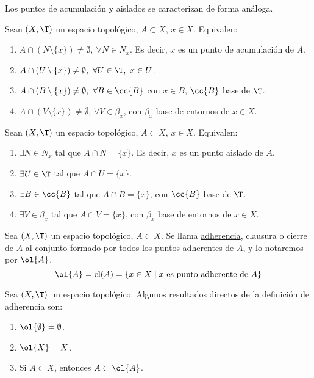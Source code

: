 Los puntos de acumulación y aislados se caracterizan de forma análoga.
\begin{prop}\label{prop:Caract_PtoAcumulación}
    Sean $(X,\T)$ un espacio topológico, $A\subset X$, $x\in X$. Equivalen:
    \begin{enumerate}
        \item $A\cap (N\setminus \{x\})\neq \emptyset,~\forall N\in N_x$. Es decir, $x$ es un punto de acumulación de $A$.
        \item $A\cap (U\setminus \{x\})\neq \emptyset,~\forall U\in \T,~x\in U$.
        \item $A\cap (B\setminus \{x\})\neq \emptyset,~\forall B\in \cc{B}$ con $x\in B$, $\cc{B}$ base de $\T$.
        \item $A\cap (V\setminus \{x\})\neq \emptyset$, $\forall V\in \beta_x$, con $\beta_x$ base de entornos de $x\in X$.
    \end{enumerate}
\end{prop}
\begin{prop}\label{prop:Caract_PtoAislado}
    Sean $(X,\T)$ un espacio topológico, $A\subset X$, $x\in X$. Equivalen:
    \begin{enumerate}
        \item $\exists N\in N_x$ tal que $A\cap N=\{x\}$. Es decir, $x$ es un punto aislado de $A$.
        \item $\exists U\in \T$ tal que $A\cap U = \{x\}$.
        \item $\exists B\in \cc{B}$ tal que $A\cap B = \{x\}$, con $\cc{B}$ base de $\T$.
        \item $\exists V\in \beta_x$ tal que $A\cap V = \{x\}$, con $\beta_x$ base de entornos de $x\in X$.
    \end{enumerate}
\end{prop}


\begin{definicion}[Adherencia] Sea $(X,\T)$ un espacio topológico, $A\subset X$. Se llama \ul{adherencia}, clausura o cierre de $A$ al conjunto formado por todos los puntos adherentes de $A$, y lo notaremos por $\ol{A}$.
\begin{equation*}
    \ol{A}=\operatorname{cl}(A)=\{x\in X\mid x \text{ es punto adherente de } A\}
\end{equation*}
\end{definicion}


Sea $(X,\T)$ un espacio topológico. Algunos resultados directos de la definición de adherencia son:
\begin{enumerate}
    \item $\ol{\emptyset}=\emptyset$.
    \item $\ol{X}=X$.
    \item Si $A\subset X$, entonces $A\subset \ol{A}$.
\end{enumerate}

